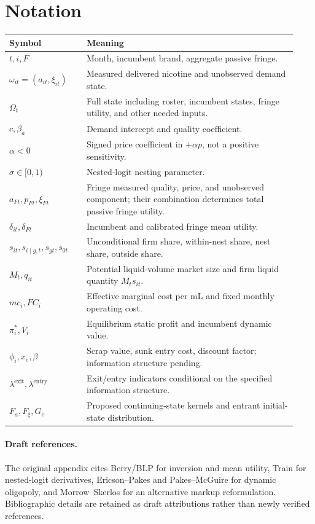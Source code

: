 \documentclass[11pt]{article}
\begin{document}
\section*{Notation}
\begin{longtable}{p{0.25\linewidth}p{0.68\linewidth}}\toprule
Symbol&Meaning\\\midrule\endhead
$t,i,F$&Month, incumbent brand, aggregate passive fringe.\\
$\omega_{it}=(a_{it},\xi_{it})$&Measured delivered nicotine and unobserved demand state.\\
$\Omega_t$&Full state including roster, incumbent states, fringe utility, and other needed inputs.\\
$c,\beta_a$&Demand intercept and quality coefficient.\\
$\alpha<0$&Signed price coefficient in $+\alpha p$, not a positive sensitivity.\\
$\sigma\in[0,1)$&Nested-logit nesting parameter.\\
$a_{Ft},p_{Ft},\xi_{Ft}$&Fringe measured quality, price, and unobserved component; their combination determines total passive fringe utility.\\
$\delta_{it},\delta_{Ft}$&Incumbent and calibrated fringe mean utility.\\
$s_{it},s_{i\mid g,t},s_{gt},s_{0t}$&Unconditional firm share, within-nest share, nest share, outside share.\\
$M_t,q_{it}$&Potential liquid-volume market size and firm liquid quantity $M_ts_{it}$.\\
$mc_i,FC_i$&Effective marginal cost per mL and fixed monthly operating cost.\\
$\pi_i^*,V_i$&Equilibrium static profit and incumbent dynamic value.\\
$\phi_i,x_e,\beta$&Scrap value, sunk entry cost, discount factor; information structure pending.\\
$\lambda^{\mathrm{exit}},\lambda^{\mathrm{entry}}$&Exit/entry indicators conditional on the specified information structure.\\
$F_a,F_\xi,G_e$&Proposed continuing-state kernels and entrant initial-state distribution.\\\bottomrule
\end{longtable}
\paragraph{Draft references.} The original appendix cites Berry/BLP for inversion and mean utility, Train for nested-logit derivatives, Ericson--Pakes and Pakes--McGuire for dynamic oligopoly, and Morrow--Skerlos for an alternative markup reformulation. Bibliographic details are retained as draft attributions rather than newly verified references.
\end{document}
